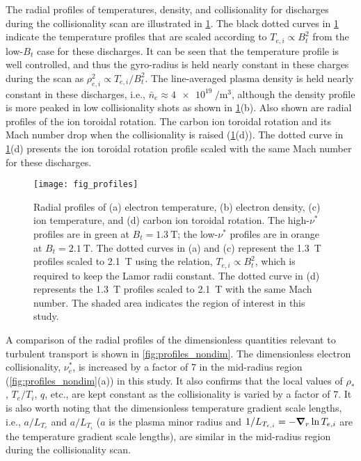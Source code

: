 \documentclass[english,aip,pop,superscriptaddress,preprint,letterpaper]{revtex4-2}
\begin{document}
The radial profiles of temperatures, density, and collisionality for discharges during the collisionality scan are illustrated in \cref{fig:profiles}.
The black dotted curves in \cref{fig:profiles} indicate the temperature profiles that are scaled according to $T_{e,i}\propto B_t^2$ from the low-\(B_t\) case for these discharges.
It can be seen that the temperature profile is well controlled, and thus the gyro-radius is held nearly constant in these charges during the scan as $\rho_{e,i}^2 \propto T_{e,i}/B_t^2$.
The line-averaged plasma density is held nearly constant in these discharges, i.e., $\bar{n}_e\approx\SI{4e19}{\per\cubic\meter}$, although the density profile is more peaked in low collisionality shots as shown in \cref{fig:profiles}(b).
Also shown are radial profiles of the ion toroidal rotation.
The carbon ion toroidal rotation and its Mach number drop when the collisionality is raised (\cref{fig:profiles}(d)).
The dotted curve in \cref{fig:profiles}(d) presents the ion toroidal rotation profile scaled with the same Mach number for these discharges.

\begin{figure}
    \texttt{[image: fig\_profiles]}
    \caption{\label{fig:profiles}Radial profiles of (a) electron temperature, (b) electron density, (c) ion temperature, and (d) carbon ion toroidal rotation. The high-\(\nu^*\) profiles are in green at \(B_t=\SI{1.3}{\tesla}\); the low-\(\nu^*\) profiles are in orange at \(B_t=\SI{2.1}{\tesla}\). The dotted curves in (a) and (c) represent the \SI{1.3}{\tesla} profiles scaled to \SI{2.1}{\tesla} using the relation, $T_{e,i}\propto B_t^2$, which is required to keep the Lamor radii constant. The dotted curve in (d) represents the \SI{1.3}{\tesla} profiles scaled to \SI{2.1}{\tesla} with the same Mach number. The shaded area indicates the region of interest in this study.}
\end{figure}

A comparison of the radial profiles of the dimensionless quantities relevant to turbulent transport is shown in \cref{fig:profiles_nondim}.
The dimensionless electron collisionality, $\nu_{e}^{*}$, is increased by a factor of 7 in the mid-radius region (\cref{fig:profiles_nondim}(a)) in this study.
It also confirms that the local values of $\rho_*$, $T_e/T_i$, $q$, etc., are kept constant as the collisionality is varied by a factor of 7.
It is also worth noting that the dimensionless temperature gradient scale lengths, i.e., $a/L_{T_{e}}$ and $a/L_{T_{i}}$ ($a$ is the plasma minor radius and $1/L_{T_{e,i}}=-\grad_r \ln T_{e,i}$ are the temperature gradient scale lengths), are similar in the mid-radius region during the collisionality scan.
\end{document}
